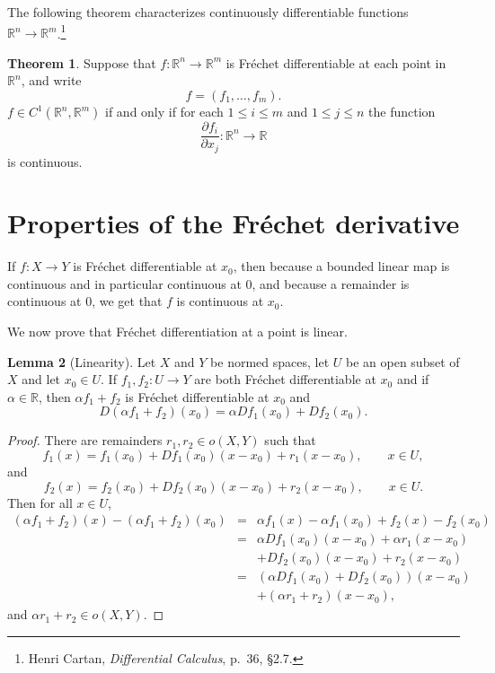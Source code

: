 \documentclass{article}
\theoremstyle{definition}
\newtheorem{theorem}{Theorem}
\newtheorem{lemma}[theorem]{Lemma}
\theoremstyle{definition}
\begin{document}
The following theorem characterizes continuously differentiable functions $\mathbb{R}^n \to \mathbb{R}^m$.\footnote{Henri
Cartan, {\em Differential Calculus}, p.~36, \S 2.7.}

\begin{theorem}
Suppose that $f:\mathbb{R}^n \to \mathbb{R}^m$ is Fr\'echet differentiable at each point in $\mathbb{R}^n$, and write
\[
f=(f_1,\ldots,f_m).
\]
$f \in C^1(\mathbb{R}^n,\mathbb{R}^m)$ if and only if for each  $1 \leq i \leq m$ and
$1 \leq j \leq n$ the function
\[
\frac{\partial f_i}{\partial x_j}:\mathbb{R}^n \to \mathbb{R} 
\]
is continuous.
\end{theorem}


\section{Properties of the Fr\'echet derivative}
\label{properties}
If $f:X \to Y$ is Fr\'echet differentiable at $x_0$, then because a bounded linear map is continuous and in particular
continuous at $0$, and because a remainder is continuous at $0$, we get that $f$ is continuous
at $x_0$.

We now prove that Fr\'echet differentiation at a point is linear.

\begin{lemma}[Linearity]
Let $X$ and $Y$ be normed spaces, let $U$ be an open subset of $X$ and let $x_0 \in U$.  If $f_1,f_2:U \to Y$  are both
Fr\'echet differentiable at $x_0$ and if $\alpha \in \mathbb{R}$,
then $\alpha f_1+f_2$ is Fr\'echet differentiable at $x_0$ and
\[
D(\alpha f_1+f_2)(x_0)=\alpha Df_1(x_0)+Df_2(x_0).
\]
\end{lemma}
\begin{proof}
There are remainders $r_1,r_2 \in o(X,Y)$ such that 
\[
f_1(x)=f_1(x_0)+Df_1(x_0)(x-x_0)+r_1(x-x_0), \qquad x \in U,
\]
and
\[
f_2(x)=f_2(x_0)+Df_2(x_0)(x-x_0)+r_2(x-x_0), \qquad x \in U.
\]
Then for all $x \in U$,
\begin{eqnarray*}
(\alpha f_1+f_2)(x)-(\alpha f_1+f_2)(x_0)&=&\alpha f_1(x)-\alpha f_1(x_0)+f_2(x)-f_2(x_0)\\
&=&\alpha Df_1(x_0)(x-x_0)+ \alpha r_1(x-x_0)\\
&&+Df_2(x_0)(x-x_0)+r_2(x-x_0)\\
&=&(\alpha Df_1(x_0)+Df_2(x_0))(x-x_0)\\
&&+(\alpha r_1+r_2)(x-x_0),
\end{eqnarray*}
and $\alpha r_1+r_2 \in o(X,Y)$.
\end{proof}
\end{document}

